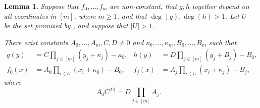 \documentclass{article}
\newtheorem{lemma}[theorem]{Lemma}
\theoremstyle{definition}
\theoremstyle{remark}
\renewcommand\geq{\geqslant}
\begin{document}
\begin{lemma} \label{lem:formula}
Suppose that $f_0,\ldots,f_m$ are non-constant, that $g,h$ together depend on all coordinates in $[m]$, where $m \geq 1$, and that $\deg(g),\deg(h) > 1$. Let $U$ be the set promised by , and suppose that $|U| > 1$.

There exist constants $A_0,\ldots,A_m,C,D \neq 0$ and $\kappa_0,\ldots,\kappa_m,B_0,\ldots,B_m$ such that
\begin{align*}
g(y) &= C \prod_{j \in [m]} (y_j + \kappa_j) - \kappa_0,
&	
h(y) &= D \prod_{j \in [m]} (y_j + B_j) - B_0,
\\
f_0(x) &= A_0 \prod_{i \in U} (x_i + \kappa_0) - B_0,
&
f_j(x) &= A_j \prod_{i \in U} (x_i + \kappa_j) - B_j,
\end{align*}
where
\[
 A_0 C^{|U|} = D \prod_{j \in [m]} A_j.
\]
\end{lemma}
\end{document}
